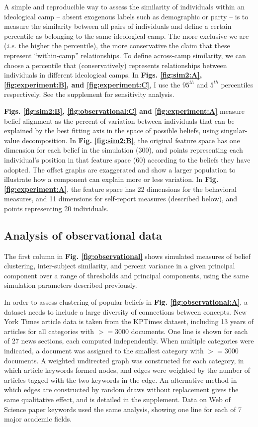\documentclass[9pt,twocolumn,twoside,lineno]{pnas-new}
\begin{document}
{A simple and reproducible way to assess the similarity of individuals within an ideological camp – absent exogenous labels such as demographic or party – is to measure the similarity between all pairs of individuals and define a certain percentile as belonging to the same ideological camp. The more exclusive we are (\textit{i.e.} the higher the percentile), the more conservative the claim that these represent “within-camp” relationships. To define across-camp similarity, we can choose a percentile that (conservatively) represents relationships between individuals in different ideological camps. In \textbf{Figs. \ref{fig:sim2:A}, \ref{fig:experiment:B}, and \ref{fig:experiment:C}}, I use the $95^{th}$ and $5^{th}$ percentiles respectively. See the supplement for sensitivity analysis.

\textbf{Figs. \ref{fig:sim2:B}, \ref{fig:observational:C} and \ref{fig:experiment:A}} measure belief alignment as the percent of variation between individuals that can be explained by the best fitting axis in the space of possible beliefs, using singular-value decomposition. In \textbf{Fig. \ref{fig:sim2:B}}, the original feature space has one dimension for each belief in the simulation (300), and points representing each individual’s position in that feature space (60) according to the beliefs they have adopted. The offset graphs are exaggerated and show a larger population to illustrate how a component can explain more or less variation. In \textbf{Fig. \ref{fig:experiment:A}}, the feature space has 22 dimensions for the behavioral measures, and 11 dimensions for self-report measures (described below), and points representing 20 individuals.

\subsection*{Analysis of observational data}
The first column in \textbf{Fig. \ref{fig:observational}} shows simulated measures of belief clustering, inter-subject similarity, and percent variance in a given principal component over a range of thresholds and principal components, using the same simulation parameters described previously. 

In order to assess clustering of popular beliefs in \textbf{Fig. \ref{fig:observational:A}}, a dataset needs to include a large diversity of connections between concepts. New York Times article data is taken from the KPTimes dataset\cite{gallina2019kptimes}, including 13 years of articles for all categories with $>= 3000$ documents. One line is shown for each of 27 news sections, each computed independently. When multiple categories were indicated, a document was assigned to the smallest category with $>= 3000$ documents. A weighted undirected graph was constructed for each category, in which article keywords formed nodes, and edges were weighted by the number of articles tagged with the two keywords in the edge. An alternative method in which edges are constructed by random draws without replacement gives the same qualitative effect, and is detailed in the supplement. Data on Web of Science paper keywords\cite{kowsari2017HDLTex} used the same analysis, showing one line for each of 7 major academic fields. 

}
\end{document}
